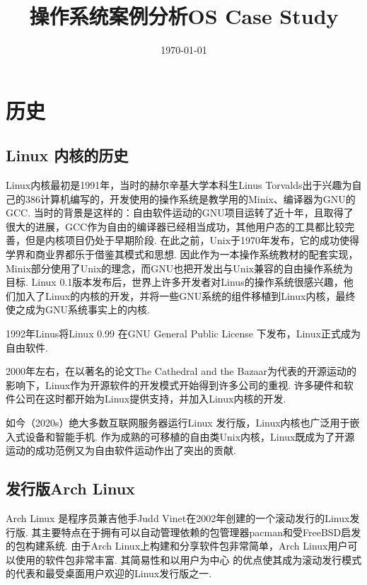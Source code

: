 \documentclass[11pt]{article}
\date{\today}
\title{操作系统案例分析}
\begin{document}
\lstset{
	breaklines=true,
	basicstyle=\ttfamily}
\title{OS Case Study}

\maketitle
\tableofcontents

\newpage

\section{历史}
\subsection{Linux 内核的历史}
Linux内核最初是1991年，当时的赫尔辛基大学本科生Linus Torvalds出于兴趣为自己的386计算机编写的，开发使用的操作系统是教学用的Minix、编译器为GNU的GCC.
当时的背景是这样的：自由软件运动的GNU项目运转了近十年，且取得了很大的进展，GCC作为自由的编译器已经相当成功，其他用户态的工具都比较完善，但是内核项目仍处于早期阶段.
在此之前，Unix于1970年发布，它的成功使得学界和商业界都乐于借鉴其模式和思想.
因此作为一本操作系统教材的配套实现，Minix部分使用了Unix的理念，而GNU也把开发出与Unix兼容的自由操作系统为目标.
Linux 0.1版本发布后，世界上许多开发者对Linus的操作系统很感兴趣，他们加入了Linux的内核的开发，并将一些GNU系统的组件移植到Linux内核，最终使之成为GNU系统事实上的内核.

1992年Linus将Linux 0.99 在GNU General Public License 下发布，Linux正式成为自由软件.

2000年左右，在以著名的论文The Cathedral and the Bazaar为代表的开源运动的影响下，Linux作为开源软件的开发模式开始得到许多公司的重视.
许多硬件和软件公司在这时都开始为Linux提供支持，并加入Linux内核的开发.

如今（2020s）绝大多数互联网服务器运行Linux 发行版\cite{OSUsageT34:online}，Linux内核也广泛用于嵌入式设备和智能手机.
作为成熟的可移植的自由类Unix内核，Linux既成为了开源运动的成功范例又为自由软件运动作出了突出的贡献.
\subsection{发行版Arch Linux}
Arch Linux 是程序员兼吉他手Judd Vinet在2002年创建的一个滚动发行的Linux发行版.
其主要特点在于拥有可以自动管理依赖的包管理器pacman和受FreeBSD启发的包构建系统\cite{DistroWa81:online}.
由于Arch Linux上构建和分享软件包非常简单，Arch Linux用户可以使用的软件包非常丰富.
其简易性和以用户为中心\cite{ArchLinux15:online} 的优点使其成为滚动发行模式的代表和最受桌面用户欢迎的Linux发行版之一.
\end{document}
